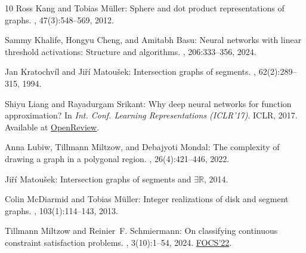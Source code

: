 \begin{thebibliography}{10}
{\sc Ross Kang and Tobias M{\"u}ller}: Sphere and dot product representations
  of graphs.
, 47(3):548--569, 2012.
\newblock [\epfmtdoi{10.1007/s00454-012-9394-8}]

{\sc Sammy Khalife, Hongyu Cheng, and Amitabh Basu}: Neural networks with
  linear threshold activations: {S}tructure and algorithms.
, 206:333--356, 2024.
\newblock [\epfmtdoi{10.1007/s10107-023-02016-5}]

{\sc Jan Kratochv{\'{i}}l and Ji{\v{r}}{\'{i}} Matou{\v{s}}ek}: Intersection
  graphs of segments.
, 62(2):289--315, 1994.

{\sc Shiyu Liang and Rayadurgam Srikant}: Why deep neural networks for function
  approximation?
\newblock In {\em Int. Conf. Learning Representations (ICLR'17)}. ICLR, 2017.
\newblock Available at
  \href{https://openreview.net/forum?id=SkpSlKIel}{OpenReview}.

{\sc Anna Lubiw, Tillmann Miltzow, and Debajyoti Mondal}: The complexity of
  drawing a graph in a polygonal region.
, 26(4):421--446, 2022.

{\sc Ji{\v{r}}{\'{i}} Matou{\v{s}}ek}: Intersection graphs of segments and
  $\exists \mathbb{R}$, 2014.

{\sc Colin McDiarmid and Tobias M{\"u}ller}: Integer realizations of disk and
  segment graphs.
, 103(1):114--143, 2013.

{\sc Tillmann Miltzow and Reinier~F. Schmiermann}: On classifying continuous
  constraint satisfaction problems.
, 3(10):1--54, 2024.
\newblock \prelim \href{https://doi.org/10.1109/FOCS52979.2021.00081}{FOCS'22}.


\end{thebibliography}
